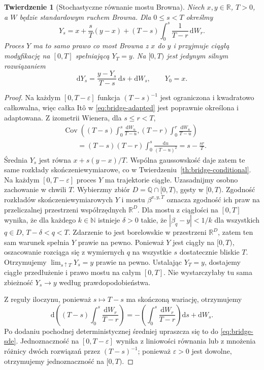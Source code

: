 \documentclass[11pt,a4paper,oneside]{report}
\numberwithin{equation}{chapter}
\theoremstyle{plain}
\newtheorem{twierdzenie}{Twierdzenie}[chapter]
\theoremstyle{definition}
\theoremstyle{remark}
\newcommand{\R}{\mathbb{R}}
\newcommand{\N}{\mathbb{N}}
\newcommand{\Cov}{\operatorname{Cov}}
\newcommand{\dd}{\mathrm{d}}
\begin{document}
\begin{twierdzenie}[Stochastyczne równanie mostu Browna]\label{thm:volIII:15:03}
\label{th:bridge-sde}
Niech $x,y\in\R$, $T>0$, a $W$ będzie standardowym
ruchem Browna. Dla $0\le s<T$ określmy
\[
 Y_s=x+\frac{s}{T}(y-x)+(T-s)\int_0^s\frac1{T-r}\,\dd W_r.
\tag{15.4}\label{eq:bridge-adapted}
\]
Proces $Y$ ma to samo prawo co most Browna z $x$ do $y$
i przyjmuje ciągłą modyfikację na $[0,T]$ spełniającą
$Y_T=y$. Na $[0,T)$ jest jedynym silnym rozwiązaniem
\[
 \dd Y_s=\frac{y-Y_s}{T-s}\,\dd s+\dd W_s,
 \qquad Y_0=x.
\tag{15.5}\label{eq:bridge-sde}
\]
\end{twierdzenie}
\begin{proof}
Na każdym $[0,T-\varepsilon]$ funkcja
$(T-s)^{-1}$ jest ograniczona i kwadratowo całkowalna,
więc całka Itô w \eqref{eq:bridge-adapted} jest
poprawnie określona i adaptowana. Z izometrii Wienera,
dla $s\le r<T$,
\[
\begin{split}
&\Cov\left((T-s)\int_0^s\frac{\dd W_u}{T-u},
 (T-r)\int_0^r\frac{\dd W_u}{T-u}\right)\\
&\qquad=(T-s)(T-r)\int_0^s\frac{\dd u}{(T-u)^2}
 =s-\frac{sr}{T}.
\end{split}
\]
Średnia $Y_s$ jest równa $x+s(y-x)/T$.
Wspólna gaussowskość daje zatem te same rozkłady
skończeniewymiarowe, co w
Twierdzeniu~\ref{th:bridge-conditional}.
Na każdym $[0,T-\varepsilon]$ proces $Y$ ma trajektorie
ciągłe. Uzasadnijmy osobno zachowanie w chwili $T$.
Wybierzmy zbiór $D=\mathbb Q\cap[0,T)$, gęsty w $[0,T)$.
Zgodność rozkładów skończeniewymiarowych $Y$ i mostu
$\beta^{x,y,T}$ oznacza zgodność ich praw na
przeliczalnej przestrzeni współrzędnych $\mathbb R^D$.
Dla mostu z ciągłości na $[0,T]$ wynika, że dla każdego
$k\in\N$ istnieje $\delta>0$ takie, że
$|\beta_q-y|<1/k$ dla wszystkich $q\in D$,
$T-\delta<q<T$. Zdarzenie to jest borelowskie
w przestrzeni $\mathbb R^D$, zatem ten sam warunek
spełnia $Y$ prawie na pewno. Ponieważ $Y$ jest ciągły
na $[0,T)$, oszacowanie rozciąga się z wymiernych $q$
na wszystkie $s$ dostatecznie bliskie $T$. Otrzymujemy
$\lim_{s\uparrow T}Y_s=y$ prawie na pewno. Ustalając
$Y_T=y$, dostajemy ciągłe przedłużenie i prawo mostu
na całym $[0,T]$. Nie wystarczyłaby tu sama zbieżność
$Y_s\to y$ według prawdopodobieństwa.

Z reguły iloczynu, ponieważ $s\mapsto T-s$ ma
skończoną wariację, otrzymujemy
\[
\dd\left((T-s)\int_0^s\frac{\dd W_r}{T-r}\right)
 =-\left(\int_0^s\frac{\dd W_r}{T-r}\right)\dd s+\dd W_s.
\]
Po dodaniu pochodnej deterministycznej średniej
upraszcza się to do \eqref{eq:bridge-sde}.
Jednoznaczność na $[0,T-\varepsilon]$ wynika z
liniowości równania lub z mnożenia różnicy dwóch
rozwiązań przez $(T-s)^{-1}$; ponieważ
$\varepsilon>0$ jest dowolne, otrzymujemy
jednoznaczność na $[0,T)$.
\end{proof}
\end{document}
